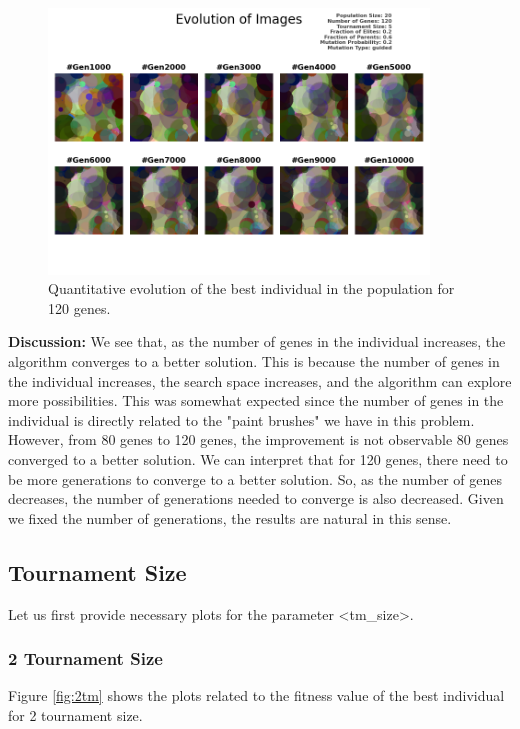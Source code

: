 \documentclass{assignment}
\begin{document}
\begin{figure}[!htb]
    \centering
    \includegraphics[width=0.9\textwidth]{figures/images_output_20_120_5_0.2_0.6_0.2_guided.png}
    \caption{Quantitative evolution of the best individual in the population for 120 genes.}
    \label{fig:120genes_image}
\end{figure}

\textbf{Discussion:} We see that, as the number of genes in the individual increases, the algorithm converges to a better solution. This is because the number of genes in the individual increases, the search space increases, and the algorithm can explore more possibilities. This was somewhat expected since the number of genes in the individual is directly related to the "paint brushes" we have in this problem. However, from 80 genes to 120 genes, the improvement is not observable 80 genes converged to a better solution. We can interpret that for 120 genes, there need to be more generations to converge to a better solution. So, as the number of genes decreases, the number of generations needed to converge is also decreased. Given we fixed the number of generations, the results are natural in this sense.

\subsection{Tournament Size}
Let us first provide necessary plots for the parameter \textless{}tm\_size\textgreater{}.

\subsubsection{2 Tournament Size}
Figure \ref{fig:2tm} shows the plots related to the fitness value of the best individual for 2 tournament size.
\end{document}
